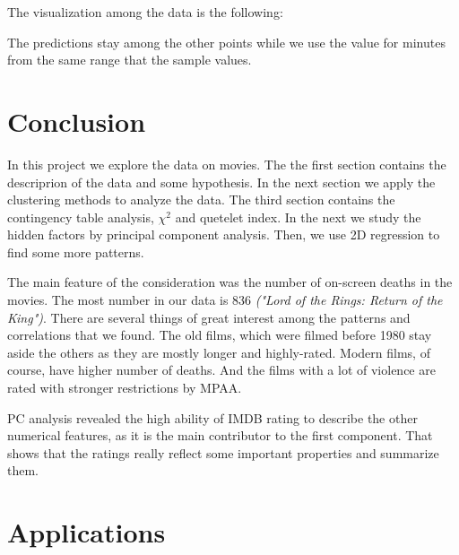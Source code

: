 \documentclass[a4paper,14pt]{article}
\begin{document}
The visualization among the data is the following:
 
\begin{center}
\end{center}
 
The predictions stay among the other points while we use the value for minutes from the same range that the sample values. 



\section{Conclusion}

In this project we explore the data on movies. The the first section contains the descriprion of the data and some hypothesis. In the next section we apply the clustering methods to analyze the data. The third section contains the contingency table analysis, $\chi^2$ and quetelet index. In the next we study the hidden factors by principal component analysis. Then, we use 2D regression to find some more patterns. 

The main feature of the consideration was the number of on-screen deaths in the movies. The most number in our data is 836 \textit{("Lord of the Rings: Return of the King")}. 
There are several things of great interest among the patterns and correlations that we found. The old films, which were filmed before  1980 stay aside the others  as they are mostly longer and highly-rated. Modern films, of course, have higher number of deaths. And the films with a lot of violence are rated with stronger restrictions by MPAA. 

PC analysis revealed the high ability of IMDB rating to describe the other numerical features, as it is the main contributor to the first component. That shows that the ratings really reflect some important properties and summarize them.




    
    \section{Applications}
    
\end{document}
